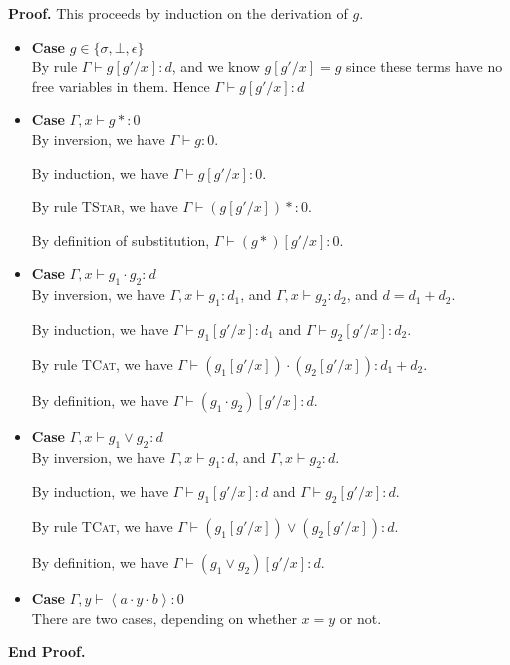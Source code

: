 \documentclass{article}
\newcommand{\lft}[1]{\left<{#1}\right.}
\newcommand{\rgt}[1]{\left.{#1}\right>}
\newcommand{\judgebalance}[3][\Gamma]{{#1} \vdash {#2} : {#3}}
\newenvironment{proof}{\noindent\textbf{Proof.}}{\noindent\textbf{End Proof.}}
\newenvironment{caseblock}{\begin{itemize}}{\end{itemize}}
\newenvironment{case}[1]{\item \textbf{Case} {#1}\\}{}
\begin{document}
\begin{proof}
  This proceeds by induction on the derivation of $g$. 

  \begin{caseblock}
    \begin{case}{$g \in \{\sigma, \bot, \epsilon\}$}
      By rule $\judgebalance{g[g'/x]}{d}$, and we know $g[g'/x] = g$ since
      these terms have no free variables in them. 
      Hence $\judgebalance{g[g'/x]}{d}$
    \end{case}

    \begin{case}{$\judgebalance[\Gamma,x]{g*}{0}$}
      By inversion, we have $\judgebalance{g}{0}$. 

      By induction, we have $\judgebalance{g[g'/x]}{0}$.

      By rule \textsc{TStar}, we have $\judgebalance{(g[g'/x])*}{0}$. 

      By definition of substitution, $\judgebalance{(g*)[g'/x]}{0}$. 
    \end{case}

    \begin{case}{$\judgebalance[\Gamma, x]{g_1\cdot g_2}{d}$}
      By inversion, we have $\judgebalance[\Gamma, x]{g_1}{d_1}$, and
        $\judgebalance[\Gamma, x]{g_2}{d_2}$, and $d = d_1 + d_2$. 
      
      By induction, we have $\judgebalance{g_1[g'/x]}{d_1}$ and 
      $\judgebalance{g_2[g'/x]}{d_2}$. 

      By rule \textsc{TCat}, we have $\judgebalance{(g_1[g'/x])\cdot(g_2[g'/x])}{d_1 + d_2}$. 
      
      By definition, we have $\judgebalance{(g_1\cdot g_2)[g'/x]}{d}$. 
    \end{case}

    \begin{case}{$\judgebalance[\Gamma, x]{g_1\vee g_2}{d}$}
      By inversion, we have $\judgebalance[\Gamma, x]{g_1}{d}$, and
        $\judgebalance[\Gamma, x]{g_2}{d}$.
      
      By induction, we have $\judgebalance{g_1[g'/x]}{d}$ and 
      $\judgebalance{g_2[g'/x]}{d}$. 

      By rule \textsc{TCat}, we have $\judgebalance{(g_1[g'/x])\vee(g_2[g'/x])}{d}$. 
      
      By definition, we have $\judgebalance{(g_1\vee g_2)[g'/x]}{d}$. 
    \end{case}
    
    \begin{case}{$\judgebalance[\Gamma, y]{\lft{a}\cdot y \cdot\rgt{b}}{0}$}
      There are two cases, depending on whether $x = y$ or not. 


\end{case}
\end{caseblock}
\end{proof}
\end{document}
